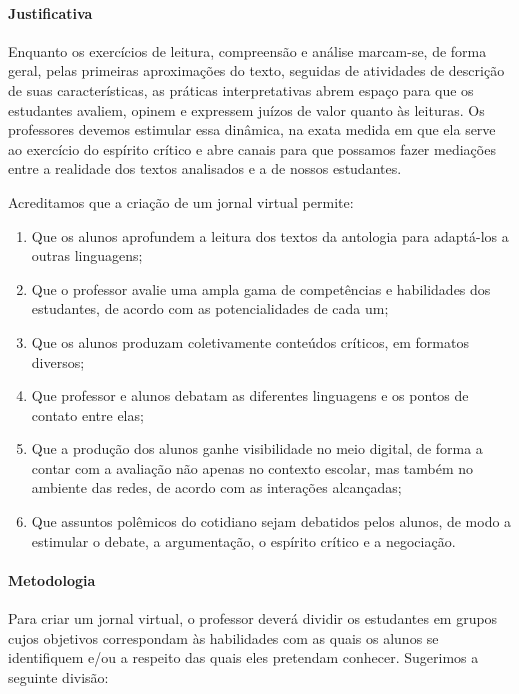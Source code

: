 \documentclass[11pt]{extarticle}
\begin{document}
\paragraph{Justificativa} Enquanto os exercícios de leitura, compreensão e
análise marcam-se, de forma geral, pelas primeiras aproximações do
texto, seguidas de atividades de descrição de suas características, as
práticas interpretativas abrem espaço para que os estudantes avaliem,
opinem e expressem juízos de valor quanto às leituras. Os professores
devemos estimular essa dinâmica, na exata medida em que ela serve ao
exercício do espírito crítico e abre canais para que possamos fazer
mediações entre a realidade dos textos analisados e a de nossos
estudantes.

Acreditamos que a criação de um jornal virtual permite:
\begin{enumerate}
\item
Que os alunos
aprofundem a leitura dos textos da antologia para adaptá-los a outras
linguagens; 
\item
Que o professor avalie uma ampla gama de competências e
habilidades dos estudantes, de acordo com as potencialidades de cada um;
\item
Que os alunos produzam coletivamente conteúdos críticos, em formatos
diversos; 
\item
Que professor e alunos debatam as diferentes linguagens e
os pontos de contato entre elas; 
\item
Que a produção dos alunos ganhe
visibilidade no meio digital, de forma a contar com a avaliação não
apenas no contexto escolar, mas também no ambiente das redes, de acordo
com as interações alcançadas; 
\item
Que assuntos polêmicos do cotidiano
sejam debatidos pelos alunos, de modo a estimular o debate, a
argumentação, o espírito crítico e a negociação.
\end{enumerate}

\paragraph{Metodologia}
Para criar um jornal virtual, o professor deverá dividir os estudantes
em grupos cujos objetivos correspondam às habilidades com as quais os
alunos se identifiquem e/ou a respeito das quais eles pretendam
conhecer. Sugerimos a seguinte divisão:
\end{document}
